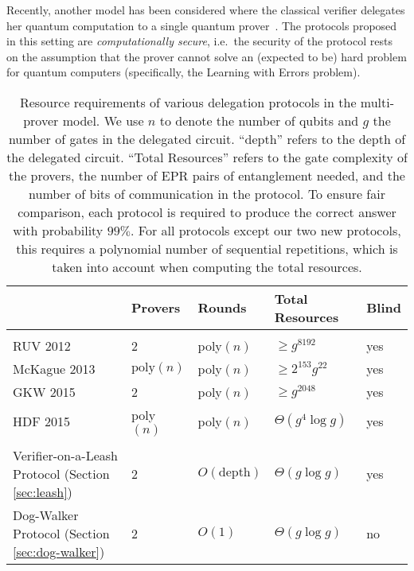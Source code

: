 Recently, another model has been considered where the classical verifier delegates her quantum computation to a single quantum prover~\cite{mahadev2018,GheorghiuV19}. The protocols proposed in this setting are {\em computationally secure}, i.e.\ the security of the protocol rests on the assumption that the prover cannot solve an (expected to be) hard problem for quantum computers (specifically, the Learning with Errors problem). 


\begin{table}[t]
\centering
\begin{tabular}{l|llll}
& Provers & Rounds & Total Resources & Blind\\
\hline\\[-8pt]
RUV 2012 \cite{reichardt2012classical}  &2 & poly$(n)$ & $\geq g^{8192}$ & yes\\[3pt]
McKague 2013 \cite{McKague16} &  $\mathrm{poly}(n)$ & poly$(n)$ & $\geq 2^{153}g^{22}$ & yes \\[3pt]
GKW 2015 \cite{Gheorghiu15} &  2 & poly$(n)$ & $\geq g^{2048}$ & yes \\[3pt]
HDF 2015 \cite{hajdusek2015} &  poly$(n)$& poly$(n)$ & $\Theta(g^4\log g)$ & yes \\[3pt]
\hline\\[-8pt]
Verifier-on-a-Leash Protocol (Section \ref{sec:leash})   & 
2 & $O(\mbox{depth})$  & $\Theta(g\log g)$ & yes \\[3pt]
Dog-Walker Protocol (Section \ref{sec:dog-walker})  & 2 & $O(1)$ & $\Theta(g\log g)$ & no 
\end{tabular}
\caption{Resource requirements of various delegation protocols in the multi-prover model. 
We use $n$ to denote the number of qubits and $g$ the number of gates in the
  delegated circuit. ``depth'' refers to the depth of the delegated circuit. ``Total Resources'' refers to the gate complexity of the
  provers, the number of EPR pairs of entanglement needed, and the number of
  bits of communication in the protocol. To ensure fair comparison, 
  each protocol is required to produce the correct answer with probability $99\%$.
  For all protocols except %
our two new protocols, this requires a
  polynomial number of sequential repetitions, which is taken into account when
  computing the total resources. %
}
\label{tab:comparison}
\end{table}



